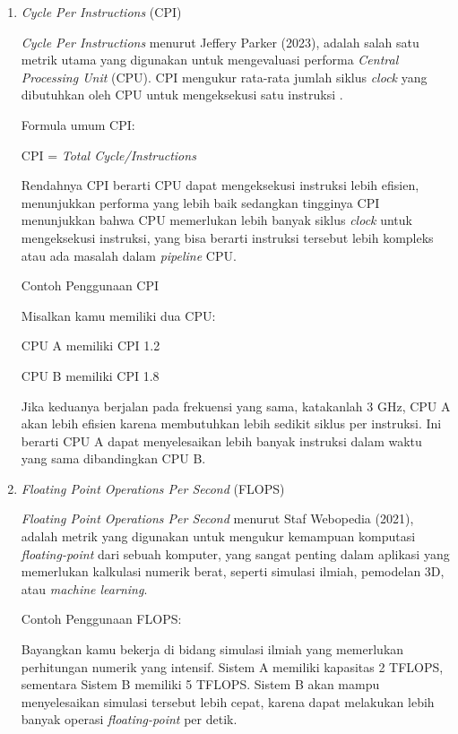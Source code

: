\documentclass[12pt]{article}
\begin{document}
\begin{enumerate}
    \item \textit{Cycle Per Instructions} (CPI) 
    \par \textit{Cycle Per Instructions} menurut Jeffery Parker (2023), adalah salah satu metrik utama yang digunakan untuk mengevaluasi performa \textit{Central Processing Unit} (CPU). CPI mengukur rata-rata jumlah siklus \textit{clock} yang dibutuhkan oleh CPU untuk mengeksekusi satu instruksi .
    \par Formula umum CPI: 
    \par CPI = \textit{Total Cycle/Instructions}
    \par Rendahnya CPI berarti CPU dapat mengeksekusi instruksi lebih efisien, menunjukkan performa yang lebih baik sedangkan tingginya CPI menunjukkan bahwa CPU memerlukan lebih banyak siklus \textit{clock} untuk mengeksekusi instruksi, yang bisa berarti instruksi tersebut lebih kompleks atau ada masalah dalam \textit{pipeline} CPU.
    \par Contoh Penggunaan CPI
    \par Misalkan kamu memiliki dua CPU: 
    \par CPU A memiliki CPI 1.2 
    \par CPU B memiliki CPI 1.8 
    \par Jika keduanya berjalan pada frekuensi yang sama, katakanlah 3 GHz, CPU A akan lebih efisien karena membutuhkan lebih sedikit siklus per instruksi. Ini berarti CPU A dapat menyelesaikan lebih banyak instruksi dalam waktu yang sama dibandingkan CPU B.

    \item \textit{Floating Point Operations Per Second} (FLOPS)
    \par \textit{Floating Point Operations Per Second} menurut Staf Webopedia (2021), adalah metrik yang digunakan untuk mengukur
    kemampuan komputasi \textit{floating-point} dari sebuah
    komputer, yang sangat penting dalam aplikasi yang
    memerlukan kalkulasi numerik berat, seperti simulasi
    ilmiah, pemodelan 3D, atau \textit{machine learning}.
    \par Contoh Penggunaan FLOPS:
    \par Bayangkan kamu bekerja di bidang simulasi ilmiah yang memerlukan perhitungan numerik yang intensif. Sistem A memiliki kapasitas 2 TFLOPS, sementara Sistem B memiliki 5 TFLOPS. Sistem B akan mampu menyelesaikan simulasi tersebut lebih cepat, karena dapat melakukan lebih banyak operasi \textit{floating-point} per detik.


\end{enumerate}
\end{document}
